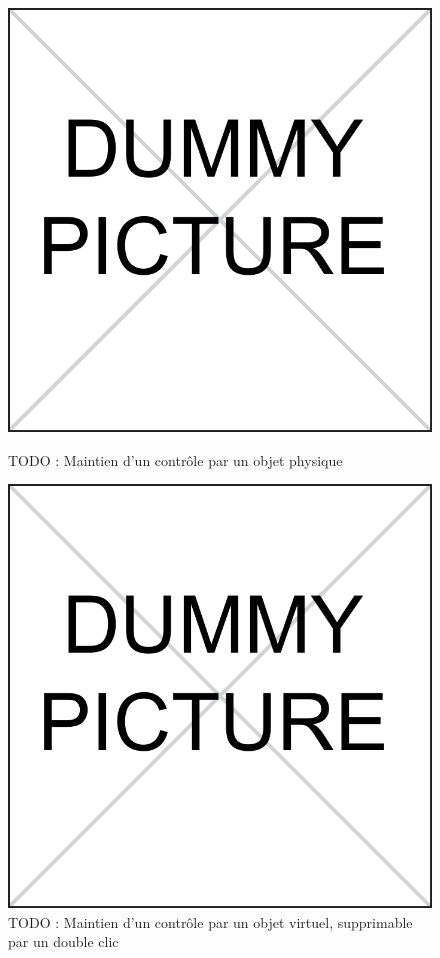 \begin{figure}[!htbp]
	\captionsetup{format=plain}%
	\centering
	\begin{minipage}[t]{0.48\textwidth}
		\includegraphics[width=\linewidth]{gfx/dummy.pdf}
		\caption{TODO : Maintien d'un contrôle par un objet physique}
		\label{fig:visual_representation:objectOnTable}
	\end{minipage}
	\hspace{.02\linewidth}
	\begin{minipage}[t]{0.48\textwidth}
	    \includegraphics[width=\linewidth]{gfx/dummy.pdf}
		\caption{TODO : Maintien d'un contrôle par un objet virtuel, supprimable par un double clic}
		\label{fig:visual_representation:dynamicInstanciation}
	\end{minipage}
\end{figure}

